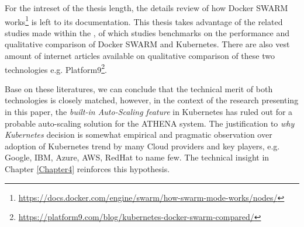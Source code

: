 For the intreset of the thesis length, the details review of how Docker SWARM works\footnote{\url{https://docs.docker.com/engine/swarm/how-swarm-mode-works/nodes/}} is left to its documentation. This thesis takes advantage of the related studies made within the \textit{\groupname}, of which studies \parencite{swarmKubeBench2} benchmarks on the performance and qualitative comparison of Docker SWARM and Kubernetes. There are also vest amount of internet articles available on qualitative comparison of these two technologies e.g. Platform9\footnote{\url{https://platform9.com/blog/kubernetes-docker-swarm-compared/}}. 

Base on these literatures, we can conclude that the technical merit of both technologies is closely matched, however, in the context of the research presenting in this paper, the \emph{built-in Auto-Scaling feature} in Kubernetes has ruled out for a probable auto-scaling solution for the ATHENA system. The justification to \emph{why Kubernetes} decision is somewhat empirical and pragmatic observation over adoption of Kubernetes trend by many Cloud providers and key players, e.g. Google, IBM, Azure, AWS, RedHat to name few. The technical insight in Chapter \ref{Chapter4} reinforces this hypothesis.

